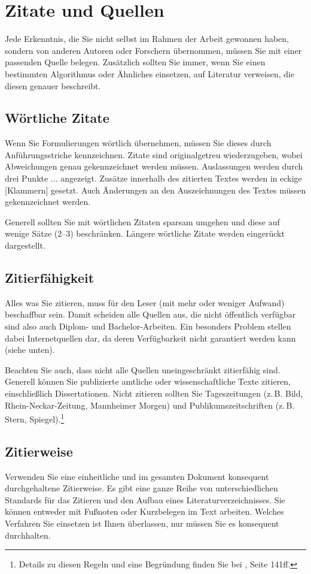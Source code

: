 \documentclass[a4paper,11pt,headings=normal]{scrartcl}
\begin{document}
\section{Zitate und Quellen}
Jede Erkenntnis, die Sie nicht selbst im Rahmen der Arbeit gewonnen haben, sondern von anderen Autoren oder Forschern übernommen, müssen Sie mit einer passenden Quelle belegen. Zusätzlich sollten Sie immer, wenn Sie einen bestimmten Algorithmus oder Ähnliches einsetzen, auf Literatur verweisen, die diesen genauer beschreibt.

\subsection{Wörtliche Zitate}
Wenn Sie Formulierungen wörtlich übernehmen, müssen Sie dieses durch Anführungsstriche kennzeichnen. Zitate sind originalgetreu wiederzugeben, wobei Abweichungen genau gekennzeichnet werden müssen. Auslassungen werden durch drei Punkte ... angezeigt. Zusätze innerhalb des zitierten Textes werden in eckige [Klammern] gesetzt. Auch Änderungen an den Auszeichnungen des Textes müssen gekennzeichnet werden.

Generell sollten Sie mit wörtlichen Zitaten sparsam umgehen und diese auf wenige Sätze (2--3) beschränken. Längere wörtliche Zitate werden eingerückt dargestellt.

\subsection{Zitierfähigkeit}
Alles was Sie zitieren, muss für den Leser (mit mehr oder weniger Aufwand) beschaffbar sein. Damit scheiden alle Quellen aus, die nicht öffentlich verfügbar sind also auch Diplom- und Bachelor-Arbeiten. Ein besonders Problem stellen dabei Internetquellen dar, da deren Verfügbarkeit nicht garantiert werden kann (siehe unten).

Beachten Sie auch, dass nicht alle Quellen uneingeschränkt zitierfähig sind. Generell können Sie publizierte amtliche oder wissenschaftliche Texte zitieren, einschließlich Dissertationen. Nicht zitieren sollten Sie Tageszeitungen (z.\,B. Bild, Rhein-Neckar-Zeitung, Mannheimer Morgen) und Publikumszeitschriften (z.\,B. Stern, Spiegel).\footnote{Details zu diesen Regeln und eine Begründung finden Sie bei \cite{Kramer2009}, Seite 141ff.}

\subsection{Zitierweise}
Verwenden Sie eine einheitliche und im gesamten Dokument konsequent durchgehaltene Zitierweise. Es gibt eine ganze Reihe von unterschiedlichen Standards für das Zitieren und den Aufbau eines Literaturverzeichnisses. Sie können entweder mit Fußnoten oder Kurzbelegen im Text arbeiten. Welches Verfahren Sie einsetzen ist Ihnen überlassen, nur müssen Sie es konsequent durchhalten.
\end{document}
